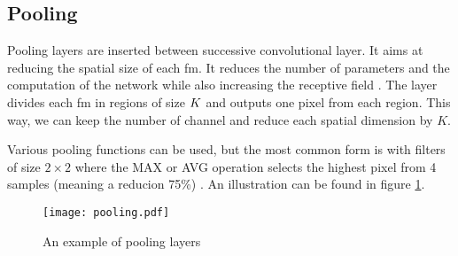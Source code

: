\subsection{Pooling} \label{subs:pooling}
Pooling layers are inserted between successive convolutional layer. It aims at reducing the spatial size of each \acrshort{fm}. It reduces the number of parameters and the computation of the network while also increasing the receptive field \cite{shawahna_fpga-based_2019}. The layer divides each \acrshort{fm} in regions of size $K \title K$ and outputs one pixel from each region. This way, we can keep the number of channel and reduce each spatial dimension by $K$.

Various pooling functions can be used, but the most common form is with filters of size $2 \times 2$ where the MAX or AVG operation selects the highest pixel from 4 samples (meaning a reducion 75\%) \cite{suda_throughput-optimized_2016}. An illustration can be found in figure \ref{fig:pool}.
%
\begin{figure}
    \centering
    \texttt{[image: pooling.pdf]}
    \caption{An example of pooling layers}
    \label{fig:pool}
\end{figure}
